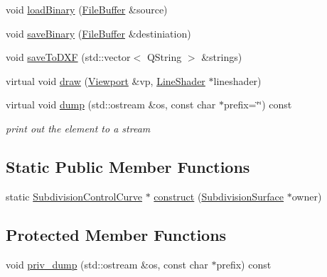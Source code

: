 \begin{DoxyCompactItemize}
\item 
void \hyperlink{classShipCADGeometry_1_1SubdivisionControlCurve_ad2a7118ea074ce1b7f61586f08039d2a}{load\-Binary} (\hyperlink{classShipCADGeometry_1_1FileBuffer}{File\-Buffer} \&source)
\item 
void \hyperlink{classShipCADGeometry_1_1SubdivisionControlCurve_a3ef4c7ce3e2d9a2fe4f90ebf35ffc033}{save\-Binary} (\hyperlink{classShipCADGeometry_1_1FileBuffer}{File\-Buffer} \&destiniation)
\item 
void \hyperlink{classShipCADGeometry_1_1SubdivisionControlCurve_a22726dc4edf385c5b4b5fead84d4c3de}{save\-To\-D\-X\-F} (std\-::vector$<$ Q\-String $>$ \&strings)
\item 
virtual void \hyperlink{classShipCADGeometry_1_1SubdivisionControlCurve_a4d7d8e87dc582529e763039ffe593360}{draw} (\hyperlink{classShipCADGeometry_1_1Viewport}{Viewport} \&vp, \hyperlink{classShipCADGeometry_1_1LineShader}{Line\-Shader} $\ast$lineshader)
\item 
virtual void \hyperlink{classShipCADGeometry_1_1SubdivisionControlCurve_a30e8d074583a386be2ab6343cb5f8502}{dump} (std\-::ostream \&os, const char $\ast$prefix=\char`\"{}\char`\"{}) const 
\begin{DoxyCompactList}\small\item\em print out the element to a stream \end{DoxyCompactList}\end{DoxyCompactItemize}
\subsection*{Static Public Member Functions}
\begin{DoxyCompactItemize}
\item 
static \hyperlink{classShipCADGeometry_1_1SubdivisionControlCurve}{Subdivision\-Control\-Curve} $\ast$ \hyperlink{classShipCADGeometry_1_1SubdivisionControlCurve_a21d9226cc2fd7efcaf6f1067912a0b34}{construct} (\hyperlink{classShipCADGeometry_1_1SubdivisionSurface}{Subdivision\-Surface} $\ast$owner)
\end{DoxyCompactItemize}
\subsection*{Protected Member Functions}
\begin{DoxyCompactItemize}
\item 
void \hyperlink{classShipCADGeometry_1_1SubdivisionControlCurve_a48fbb761e8c85120ba7f6876d873e898}{priv\-\_\-dump} (std\-::ostream \&os, const char $\ast$prefix) const 
\end{DoxyCompactItemize}
